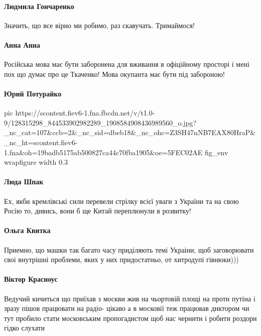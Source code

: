 \paragraph{Людмила Гончаренко}

Значить, що все вірно ми робимо, раз скавучать. Тримаймося!

\paragraph{Анна Анна}

Російська мова має бути заборонена для вживання в офіційному просторі і мені
пох що думає про це Ткаченко! Мова окупанта має бути під забороною!

\paragraph{Юрий Потурайко}

\ifcmt
pic https://scontent.fiev6-1.fna.fbcdn.net/v/t1.0-9/128315298_844533902982289_1908584908436989560_o.jpg?_nc_cat=107&ccb=2&_nc_sid=dbeb18&_nc_ohc=Z3SH47nNB7EAX80HraP&_nc_ht=scontent.fiev6-1.fna&oh=19badb5175ab500827ca44c70fba1905&oe=5FEC02AE
fig_env wrapfigure
width 0.3
\fi

\paragraph{Люда Шпак}

Ех, якби кремлівські сили перевели стрілку всієї уваги з України та на свою
Росію то, дивись, вони б ще Китай переплюнули в розвитку!

\paragraph{Ольга Квитка}

Приемно, що машки так багато часу приділяють темі Украіни, щоб заговорювати
своі внутрішні проблеми, яких у них придостатньо, от хитродупі гівнюки)))

\paragraph{Віктор Красноус}

Ведучий кичиться що приїхав з москви жив на чьортовій площі на проти путіна і
зразу пішов працювати на радіо- цікаво а в московії теж працював диктором чи
тут пробило стати московським пропогадистом щоб нас чернити і робити роздори
гідко слухати

